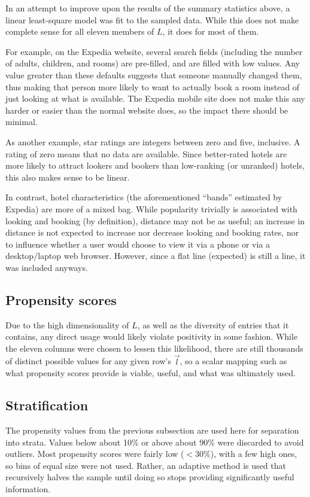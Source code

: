 \documentclass{article}
\begin{document}
In an attempt to improve upon the results of the summary statistics above, a
linear least-square model was fit to the sampled data.  While this does not make
complete sense for all eleven members of $L$, it does for most of them.

For example, on the Expedia website, several search fields (including the number
of adults, children, and rooms) are pre-filled, and are filled with low values.
Any value greater than these defaults suggests that someone manually changed
them, thus making that person more likely to want to actually book a room
instead of just looking at what is available.  The Expedia mobile site does not
make this any harder or easier than the normal website does, so the impact there
should be minimal.

As another example, star ratings are integers between zero and five, inclusive.
A rating of zero means that no data are available.  Since better-rated hotels
are more likely to attract lookers and bookers than low-ranking (or unranked)
hotels, this also makes sense to be linear.

In contrast, hotel characteristics (the aforementioned ``bands'' estimated by
Expedia) are more of a mixed bag.  While popularity trivially is associated with
looking and booking (by definition), distance may not be as useful; an increase
in distance is not expected to increase nor decrease looking and booking rates,
nor to influence whether a user would choose to view it via a phone or via a
desktop/laptop web browser.  However, since a flat line (expected) is still a
line, it was included anyways.

\subsection{Propensity scores}

Due to the high dimensionality of $L$, as well as the diversity of entries that
it contains, any direct usage would likely violate positivity in some fashion.
While the eleven columns were chosen to lessen this likelihood, there are still
thousands of distinct possible values for any given row's $\vec{l}$, so a scalar
mapping such as what propensity scores provide is viable, useful, and what was
ultimately used.

\subsection{Stratification}

The propensity values from the previous subsection are used here for separation
into strata.  Values below about 10\% or above about 90\% were discarded to
avoid outliers.  Most propensity scores were fairly low ($<30\%$), with a few
high ones, so bins of equal size were not used.  Rather, an adaptive method is
used that recursively halves the sample until doing so stops providing
significantly useful information.
\end{document}
